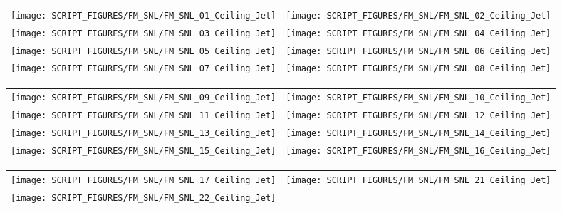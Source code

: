 \begin{figure}[!ht]
\begin{tabular*}{\textwidth}{l@{\extracolsep{\fill}}r}
\texttt{[image: SCRIPT\_FIGURES/FM\_SNL/FM\_SNL\_01\_Ceiling\_Jet]} &
\texttt{[image: SCRIPT\_FIGURES/FM\_SNL/FM\_SNL\_02\_Ceiling\_Jet]} \\
\texttt{[image: SCRIPT\_FIGURES/FM\_SNL/FM\_SNL\_03\_Ceiling\_Jet]} &
\texttt{[image: SCRIPT\_FIGURES/FM\_SNL/FM\_SNL\_04\_Ceiling\_Jet]} \\
\texttt{[image: SCRIPT\_FIGURES/FM\_SNL/FM\_SNL\_05\_Ceiling\_Jet]} &
\texttt{[image: SCRIPT\_FIGURES/FM\_SNL/FM\_SNL\_06\_Ceiling\_Jet]} \\
\texttt{[image: SCRIPT\_FIGURES/FM\_SNL/FM\_SNL\_07\_Ceiling\_Jet]} &
\texttt{[image: SCRIPT\_FIGURES/FM\_SNL/FM\_SNL\_08\_Ceiling\_Jet]}
\end{tabular*}
\end{figure}

\begin{figure}[!ht]
\begin{tabular*}{\textwidth}{l@{\extracolsep{\fill}}r}
\texttt{[image: SCRIPT\_FIGURES/FM\_SNL/FM\_SNL\_09\_Ceiling\_Jet]} &
\texttt{[image: SCRIPT\_FIGURES/FM\_SNL/FM\_SNL\_10\_Ceiling\_Jet]} \\
\texttt{[image: SCRIPT\_FIGURES/FM\_SNL/FM\_SNL\_11\_Ceiling\_Jet]} &
\texttt{[image: SCRIPT\_FIGURES/FM\_SNL/FM\_SNL\_12\_Ceiling\_Jet]} \\
\texttt{[image: SCRIPT\_FIGURES/FM\_SNL/FM\_SNL\_13\_Ceiling\_Jet]} &
\texttt{[image: SCRIPT\_FIGURES/FM\_SNL/FM\_SNL\_14\_Ceiling\_Jet]} \\
\texttt{[image: SCRIPT\_FIGURES/FM\_SNL/FM\_SNL\_15\_Ceiling\_Jet]} &
\texttt{[image: SCRIPT\_FIGURES/FM\_SNL/FM\_SNL\_16\_Ceiling\_Jet]}
\end{tabular*}
\end{figure}

\begin{figure}[!ht]
\begin{tabular*}{\textwidth}{l@{\extracolsep{\fill}}r}
\texttt{[image: SCRIPT\_FIGURES/FM\_SNL/FM\_SNL\_17\_Ceiling\_Jet]} &
\texttt{[image: SCRIPT\_FIGURES/FM\_SNL/FM\_SNL\_21\_Ceiling\_Jet]} \\
\texttt{[image: SCRIPT\_FIGURES/FM\_SNL/FM\_SNL\_22\_Ceiling\_Jet]}
\end{tabular*}
\end{figure}

